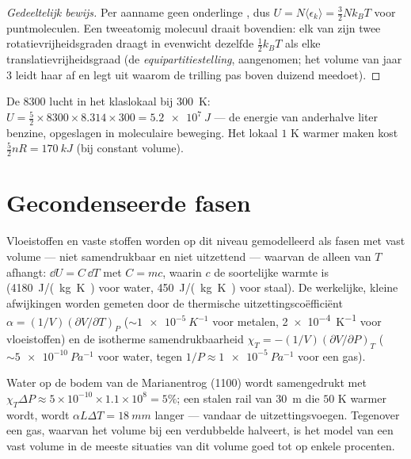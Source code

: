 \begin{proof}[Gedeeltelijk bewijs]
Per aanname geen onderlinge , dus $U = N\langle\epsilon_k\rangle
= \tfrac32 Nk_BT$ voor puntmoleculen. Een tweeatomig molecuul draait bovendien:
elk van zijn twee rotatievrijheidsgraden draagt in evenwicht
dezelfde $\tfrac12 k_BT$ als elke translatievrijheidsgraad (de \emph{equipartitiestelling},
aangenomen; het volume van jaar 3 leidt haar af en legt uit waarom de
trilling pas boven duizend  meedoet).
\end{proof}

\begin{example}\label{ex:b1:kinetic-theory:room}
De \qty{8300}{} lucht in het klaslokaal bij \qty{300}{K}: $U = \tfrac52 \times
8300 \times 8.314 \times 300 = \qty{5.2e7}{J}$ --- de energie van anderhalve
liter benzine, opgeslagen in moleculaire beweging. Het lokaal $1$ K warmer maken
kost $\tfrac52 nR = \qty{170}{kJ}$ (bij constant volume).
\end{example}

\section{Gecondenseerde fasen}

\begin{proposition}\label{prop:b1:kinetic-theory:condensed}
Vloeistoffen en vaste stoffen worden op dit niveau gemodelleerd als fasen met vast
volume --- niet samendrukbaar en niet uitzettend --- waarvan de 
alleen van $T$ afhangt: $\dd U = C\,\dd T$ met $C = mc$, waarin $c$ de soortelijke
warmte is (\qty{4180}{J/(kg.K)} voor water, \qty{450}{J/(kg.K)} voor
staal). De werkelijke, kleine afwijkingen worden gemeten door de thermische
uitzettingscoëfficiënt $\alpha = (1/V)(\partial V/\partial T)_P$ ($\sim\qty{1e-5}{K^{-1}}$
voor metalen, \qty{2e-4}{K^{-1}} voor vloeistoffen) en de isotherme
samendrukbaarheid $\chi_T = -(1/V)(\partial V/\partial P)_T$ ($\sim\qty{5e-10}{Pa^{-1}}$
voor water, tegen $1/P \approx \qty{1e-5}{Pa^{-1}}$ voor een gas).
\end{proposition}
\admitted

\begin{example}\label{ex:b1:kinetic-theory:water}
Water op de bodem van de Marianentrog (\qty{1100}{}) wordt samengedrukt
met $\chi_T\Delta P \approx 5\times10^{-10} \times 1.1\times10^8 = 5\%$; een
stalen rail van \qty{30}{m} die $50$ K warmer wordt, wordt $\alpha L\Delta T =
\qty{18}{mm}$ langer --- vandaar de uitzettingsvoegen. Tegenover een gas, waarvan
het volume bij een verdubbelde  halveert, is het model van een vast volume
in de meeste situaties van dit volume goed tot op enkele procenten.
\end{example}

